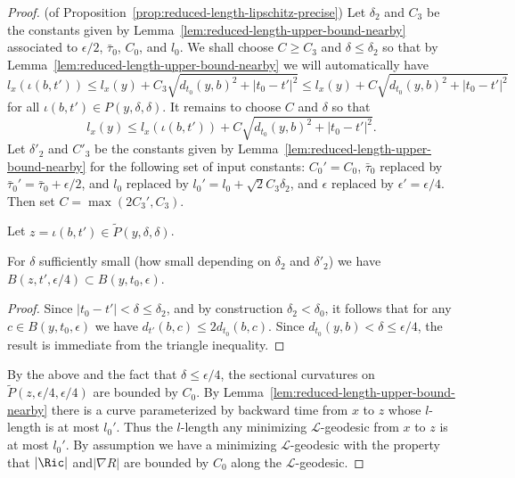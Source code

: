 \begin{proof}(of Proposition~\ref{prop:reduced-length-lipschitz-precise})
Let $\delta_2$ and $C_3$ be the constants given by
Lemma~\ref{lem:reduced-length-upper-bound-nearby} associated to $\epsilon/2$, $\bar\tau_0$, $C_0$,
and $l_0$. We shall choose $C\ge C_3$ and $\delta\le \delta_2$ so
that by Lemma~\ref{lem:reduced-length-upper-bound-nearby} we will automatically have
$$l_x(\iota(b,t'))\le l_x(y)+C_3\sqrt{d_{t_0}(y,b)^2+|t_0-t'|^2}
\le l_x(y)+C\sqrt{d_{t_0}(y,b)^2+|t_0-t'|^2}$$ for all
$\iota(b,t')\in P(y,\delta,\delta)$. It remains to choose $C$ and
$\delta$ so that
$$l_x(y)\le l_x(\iota(b,t'))+C\sqrt{d_{t_0}(y,b)^2+|t_0-t'|^2}.$$
 Let
$\delta'_2$ and $ C'_3$ be the constants given by
Lemma~\ref{lem:reduced-length-upper-bound-nearby} for the following set of input constants:
$C_0'=C_0$, $\bar\tau_0$ replaced by
$\bar\tau_0'=\bar\tau_0+\epsilon/2$, and $l_0$ replaced by
$l_0'=l_0+\sqrt{2}C_3\delta_2$, and $\epsilon$ replaced by
$\epsilon'=\epsilon/4$. Then set $C=\max(2C_3',C_3)$.

Let $z=\iota(b,t')\in \widetilde P(y,\delta,\delta)$.

\begin{claim}\label{claim:parabolic-ball-containment}
For $\delta$ sufficiently small (how small depending on $\delta_2$
and $\delta'_2$) we have $B(z,t',\epsilon/4)\subset
B(y,t_0,\epsilon)$.
\end{claim}

\begin{proof}
Since $|t_0-t'|<\delta\le \delta_2$, and by construction
$\delta_2<\delta_0$, it follows  that for any $c\in
B(y,t_0,\epsilon)$ we have $d_{t'}(b,c)\le 2d_{t_0}(b,c)$. Since
$d_{t_0}(y,b)<\delta\le \epsilon/4$, the result is immediate from
the triangle inequality.
\end{proof}

 By
the above and the fact that $ \delta\le\epsilon/4$, the sectional
curvatures on $\widetilde P(z,\epsilon/4,\epsilon/4)$ are bounded by
$C_0$. By Lemma~\ref{lem:reduced-length-upper-bound-nearby} there is a curve parameterized by
backward time from $x$ to $z$ whose $l$-length is at most $l_0'$.
Thus the $l$-length any minimizing ${\mathcal L}$-geodesic from $x$
to $z$ is at most $l_0'$. By assumption we have a minimizing
${\mathcal L}$-geodesic with the property that  $|\Ric|$
and$|\nabla R|$ are bounded by $C_0$ along the ${\mathcal
L}$-geodesic.


\end{proof}
